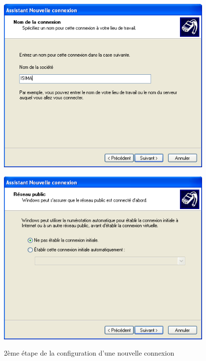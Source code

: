 \begin{figure}[H]
	\begin{minipage}{0.5\textwidth}
		\begin{flushleft} \large
			\includegraphics[width=0.95\textwidth]{partie_2/screen_windows/etape3.PNG}\\
		\end{flushleft}
	\end{minipage}
	\begin{minipage}{0.49\textwidth}
		\begin{flushright} \large
			\includegraphics[width=0.95\textwidth]{partie_2/screen_windows/etape4.PNG}\\
		\end{flushright}
	\end{minipage}
	\caption{2ème étape de la configuration d'une nouvelle connexion}
	\label{VPN_ETAPE2}
\end{figure}
~\


